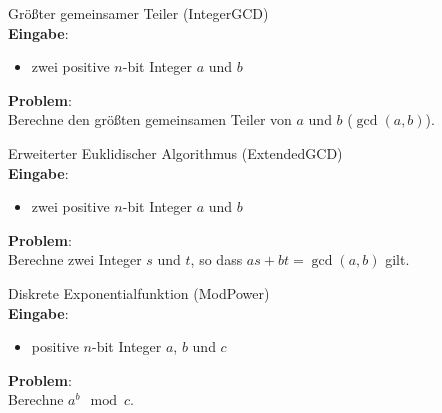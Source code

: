 \begin{problem}
    Größter gemeinsamer Teiler (IntegerGCD) \\
    \textbf{Eingabe}:
    \begin{itemize}
        \item zwei positive $n$-bit Integer $a$ und $b$
    \end{itemize}
    \textbf{Problem}: \\
    Berechne den größten gemeinsamen Teiler von $a$ und $b$ ($\gcd(a,b)$).
    \cite[S.229]{greenlaw}
\end{problem}

\begin{problem}
    Erweiterter Euklidischer Algorithmus (ExtendedGCD) \\
    \textbf{Eingabe}:
    \begin{itemize}
        \item zwei positive $n$-bit Integer $a$ und $b$
    \end{itemize}
    \textbf{Problem}: \\
    Berechne zwei Integer $s$ und $t$, so dass $as + bt = \gcd(a,b)$ gilt.
    \cite[S.229]{greenlaw}
\end{problem}

\begin{problem}
    Diskrete Exponentialfunktion (ModPower) \\
    \textbf{Eingabe}:
    \begin{itemize}
        \item positive $n$-bit Integer $a$, $b$ und $c$
    \end{itemize}
    \textbf{Problem}: \\
    Berechne $a^b \mod c$.
    \cite[S.231]{greenlaw}
\end{problem}
